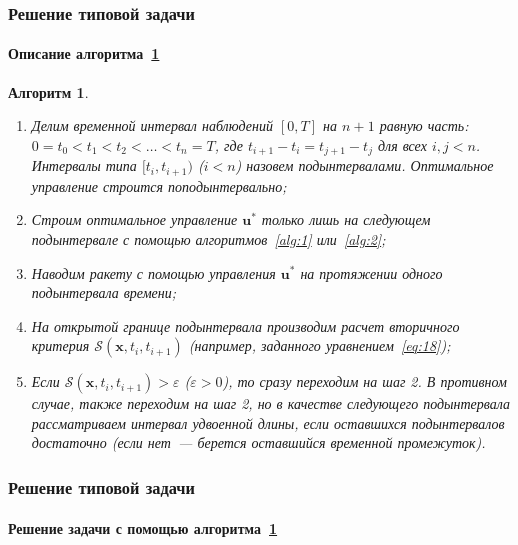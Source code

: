 \documentclass[ignorenonframetext,hyperref={pdftex,unicode,pdfpagelabels=false},compress]{beamer}
\newtheorem{alg}{Алгоритм}
\begin{document}
\begin{frame}
    \frametitle{Решение типовой задачи}
    \framesubtitle{Описание алгоритма~\ref{alg:4}}\footnotesize

    \begin{alg}\label{alg:4}~
        \begin{enumerate}
            \item
                Делим временной интервал наблюдений $[0, T]$ на $n+1$ равную часть: $0 = t_0 < t_1 < t_2 < \ldots < t_{n} = T$, где $t_{i+1}-t_i = t_{j+1}-t_j$ для всех $i, j < n$. Интервалы типа $[t_i, t_{i+1})$ ($i<n$) назовем подынтервалами. Оптимальное управление строится поподынтервально;

            \item
                Строим оптимальное управление $\mathbf{u}^*$ только лишь на следующем подынтервале с помощью алгоритмов~\ref{alg:1} или~\ref{alg:2};

            \item
                Наводим ракету с помощью управления $\mathbf{u}^*$ на протяжении одного подынтервала времени;

            \item
                На открытой границе подынтервала производим расчет вторичного критерия $\mathscr{S}(\mathbf{x}, t_i, t_{i+1})$ (например, заданного уравнением~\ref{eq:18});

            \item
                Если $\mathscr{S}(\mathbf{x}, t_i, t_{i+1}) > \varepsilon$ ($\varepsilon > 0$), то сразу переходим на шаг 2. В противном случае, также переходим на шаг 2, но в качестве следующего подынтервала рассматриваем интервал удвоенной длины, если оставшихся подынтервалов достаточно (если нет~--- берется оставшийся временной промежуток).
        \end{enumerate}
    \end{alg}
\end{frame}



\begin{frame}
    \frametitle{Решение типовой задачи}
    \framesubtitle{Решение задачи с помощью алгоритма~\ref{alg:4}}

    \begin{figure}\center
        
        \label{fig:alg4}
    \end{figure}
\end{frame}
\end{document}
